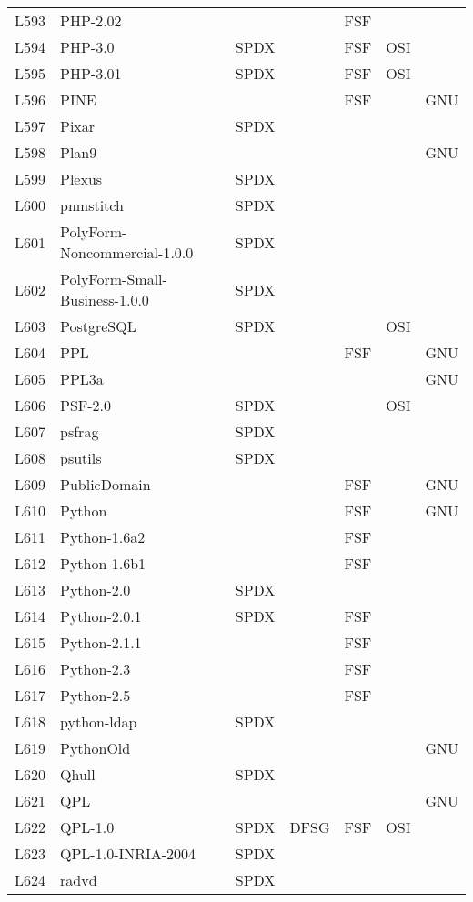 \begin{longtable}[h]{m{2cm} | m{7cm} | c | c | c | c | c}
  L593 & PHP-2.02 &  &  & FSF &  &  \\
  L594 & PHP-3.0 & SPDX &  & FSF & OSI &  \\
  L595 & PHP-3.01 & SPDX &  & FSF & OSI &  \\
  L596 & PINE &  &  & FSF &  & GNU \\
  L597 & Pixar & SPDX &  &  &  &  \\
  L598 & Plan9 &  &  &  &  & GNU \\
  L599 & Plexus & SPDX &  &  &  &  \\
  L600 & pnmstitch & SPDX &  &  &  &  \\
  L601 & PolyForm-Noncommercial-1.0.0 & SPDX &  &  &  &  \\
  L602 & PolyForm-Small-Business-1.0.0 & SPDX &  &  &  &  \\
  L603 & PostgreSQL & SPDX &  &  & OSI &  \\
  L604 & PPL &  &  & FSF &  & GNU \\
  L605 & PPL3a &  &  &  &  & GNU \\
  L606 & PSF-2.0 & SPDX &  &  & OSI &  \\
  L607 & psfrag & SPDX &  &  &  &  \\
  L608 & psutils & SPDX &  &  &  &  \\
  L609 & PublicDomain &  &  & FSF &  & GNU \\
  L610 & Python &  &  & FSF &  & GNU \\
  L611 & Python-1.6a2 &  &  & FSF &  &  \\
  L612 & Python-1.6b1 &  &  & FSF &  &  \\
  L613 & Python-2.0 & SPDX &  &  &  &  \\
  L614 & Python-2.0.1 & SPDX &  & FSF &  &  \\
  L615 & Python-2.1.1 &  &  & FSF &  &  \\
  L616 & Python-2.3 &  &  & FSF &  &  \\
  L617 & Python-2.5 &  &  & FSF &  &  \\
  L618 & python-ldap & SPDX &  &  &  &  \\
  L619 & PythonOld &  &  &  &  & GNU \\
  L620 & Qhull & SPDX &  &  &  &  \\
  L621 & QPL &  &  &  &  & GNU \\
  L622 & QPL-1.0 & SPDX & DFSG & FSF & OSI &  \\
  L623 & QPL-1.0-INRIA-2004 & SPDX &  &  &  &  \\
  L624 & radvd & SPDX &  &  &  &  \\

\end{longtable}

